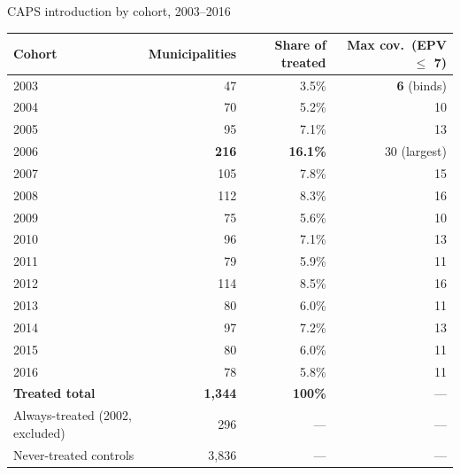 \documentclass[aspectratio=169,12pt,t]{beamer}
\begin{document}
\begin{frame}{CAPS introduction by cohort, 2003--2016}
\vspace{-0.05cm}
\begin{center}
\scriptsize
\setlength{\tabcolsep}{5pt}
\renewcommand{\arraystretch}{0.85}
\begin{tabular}{lrrr}
\toprule
\textbf{Cohort} & \textbf{Municipalities} & \textbf{Share of treated} & \textbf{Max cov.\ (EPV $\leq$ 7)} \\
\midrule
\rowcolor{remixgreenlight!50} 2003 & 47   & 3.5\%  & \textbf{6} \;(binds) \\
2004 & 70   & 5.2\%  & 10 \\
2005 & 95   & 7.1\%  & 13 \\
\rowcolor{remixgreenlight!50} 2006 & \textbf{216}  & \textbf{16.1\%} & 30 \;(largest) \\
2007 & 105  & 7.8\%  & 15 \\
2008 & 112  & 8.3\%  & 16 \\
2009 & 75   & 5.6\%  & 10 \\
2010 & 96   & 7.1\%  & 13 \\
2011 & 79   & 5.9\%  & 11 \\
2012 & 114  & 8.5\%  & 16 \\
2013 & 80   & 6.0\%  & 11 \\
2014 & 97   & 7.2\%  & 13 \\
2015 & 80   & 6.0\%  & 11 \\
2016 & 78   & 5.8\%  & 11 \\
\midrule
\textbf{Treated total} & \textbf{1{,}344} & \textbf{100\%} & --- \\
Always-treated (2002, excluded) & 296 & --- & --- \\
Never-treated controls & 3{,}836 & --- & --- \\
\bottomrule
\end{tabular}
\end{center}
\vspace{0.05cm}
\begin{center}
\end{center}
\end{frame}

\end{document}
